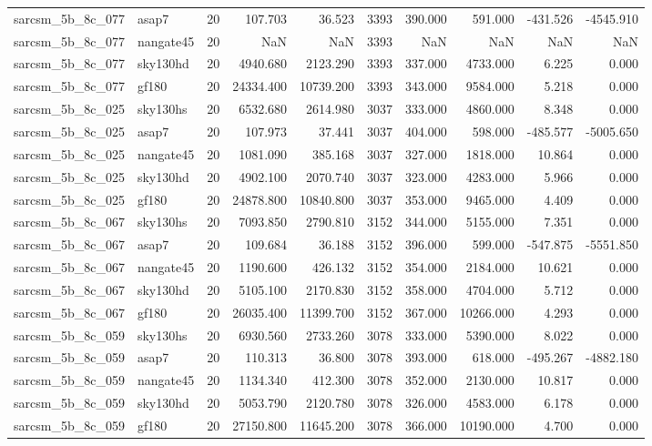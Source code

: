 \documentclass{article}
\begin{document}
\begin{longtable}{llrrrrrrrr}
sarcsm\_5b\_8c\_077 & asap7 & 20 & 107.703 & 36.523 & 3393 & 390.000 & 591.000 & -431.526 & -4545.910 \\
sarcsm\_5b\_8c\_077 & nangate45 & 20 & NaN & NaN & 3393 & NaN & NaN & NaN & NaN \\
sarcsm\_5b\_8c\_077 & sky130hd & 20 & 4940.680 & 2123.290 & 3393 & 337.000 & 4733.000 & 6.225 & 0.000 \\
sarcsm\_5b\_8c\_077 & gf180 & 20 & 24334.400 & 10739.200 & 3393 & 343.000 & 9584.000 & 5.218 & 0.000 \\
sarcsm\_5b\_8c\_025 & sky130hs & 20 & 6532.680 & 2614.980 & 3037 & 333.000 & 4860.000 & 8.348 & 0.000 \\
sarcsm\_5b\_8c\_025 & asap7 & 20 & 107.973 & 37.441 & 3037 & 404.000 & 598.000 & -485.577 & -5005.650 \\
sarcsm\_5b\_8c\_025 & nangate45 & 20 & 1081.090 & 385.168 & 3037 & 327.000 & 1818.000 & 10.864 & 0.000 \\
sarcsm\_5b\_8c\_025 & sky130hd & 20 & 4902.100 & 2070.740 & 3037 & 323.000 & 4283.000 & 5.966 & 0.000 \\
sarcsm\_5b\_8c\_025 & gf180 & 20 & 24878.800 & 10840.800 & 3037 & 353.000 & 9465.000 & 4.409 & 0.000 \\
sarcsm\_5b\_8c\_067 & sky130hs & 20 & 7093.850 & 2790.810 & 3152 & 344.000 & 5155.000 & 7.351 & 0.000 \\
sarcsm\_5b\_8c\_067 & asap7 & 20 & 109.684 & 36.188 & 3152 & 396.000 & 599.000 & -547.875 & -5551.850 \\
sarcsm\_5b\_8c\_067 & nangate45 & 20 & 1190.600 & 426.132 & 3152 & 354.000 & 2184.000 & 10.621 & 0.000 \\
sarcsm\_5b\_8c\_067 & sky130hd & 20 & 5105.100 & 2170.830 & 3152 & 358.000 & 4704.000 & 5.712 & 0.000 \\
sarcsm\_5b\_8c\_067 & gf180 & 20 & 26035.400 & 11399.700 & 3152 & 367.000 & 10266.000 & 4.293 & 0.000 \\
sarcsm\_5b\_8c\_059 & sky130hs & 20 & 6930.560 & 2733.260 & 3078 & 333.000 & 5390.000 & 8.022 & 0.000 \\
sarcsm\_5b\_8c\_059 & asap7 & 20 & 110.313 & 36.800 & 3078 & 393.000 & 618.000 & -495.267 & -4882.180 \\
sarcsm\_5b\_8c\_059 & nangate45 & 20 & 1134.340 & 412.300 & 3078 & 352.000 & 2130.000 & 10.817 & 0.000 \\
sarcsm\_5b\_8c\_059 & sky130hd & 20 & 5053.790 & 2120.780 & 3078 & 326.000 & 4583.000 & 6.178 & 0.000 \\
sarcsm\_5b\_8c\_059 & gf180 & 20 & 27150.800 & 11645.200 & 3078 & 366.000 & 10190.000 & 4.700 & 0.000 \\

\end{longtable}
\end{document}
